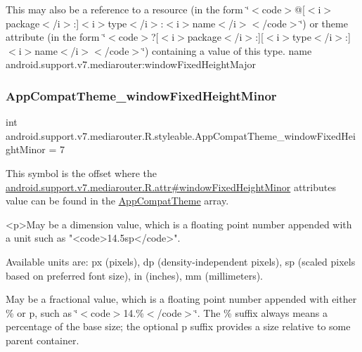 This may also be a reference to a resource (in the form \char`\"{}$<$code$>$@\mbox{[}$<$i$>$package$<$/i$>$\+:\mbox{]}$<$i$>$type$<$/i$>$\+:$<$i$>$name$<$/i$>$$<$/code$>$\char`\"{}) or theme attribute (in the form \char`\"{}$<$code$>$?\mbox{[}$<$i$>$package$<$/i$>$\+:\mbox{]}\mbox{[}$<$i$>$type$<$/i$>$\+:\mbox{]}$<$i$>$name$<$/i$>$$<$/code$>$\char`\"{}) containing a value of this type.  name android.\+support.\+v7.\+mediarouter\+:window\+Fixed\+Height\+Major \mbox{\label{classandroid_1_1support_1_1v7_1_1mediarouter_1_1R_1_1styleable_a9d793fbf38eeb7d1b8c2707b951dcf24}} 
\subsubsection{\texorpdfstring{App\+Compat\+Theme\+\_\+window\+Fixed\+Height\+Minor}{AppCompatTheme\_windowFixedHeightMinor}}
{\footnotesize\ttfamily int android.\+support.\+v7.\+mediarouter.\+R.\+styleable.\+App\+Compat\+Theme\+\_\+window\+Fixed\+Height\+Minor = 7\hspace{0.3cm}{\ttfamily [static]}}

This symbol is the offset where the \hyperlink{classandroid_1_1support_1_1v7_1_1mediarouter_1_1R_1_1attr_a6225254ac3740a7bf55305b4825f479b}{android.\+support.\+v7.\+mediarouter.\+R.\+attr\#window\+Fixed\+Height\+Minor} attribute\textquotesingle{}s value can be found in the \hyperlink{classandroid_1_1support_1_1v7_1_1mediarouter_1_1R_1_1styleable_a4e3d3900c75d49aeb2f283cac00214d6}{App\+Compat\+Theme} array.

\begin{DoxyVerb}      <p>May be a dimension value, which is a floating point number appended with a unit such as "<code>14.5sp</code>".
\end{DoxyVerb}
 Available units are\+: px (pixels), dp (density-\/independent pixels), sp (scaled pixels based on preferred font size), in (inches), mm (millimeters). 

May be a fractional value, which is a floating point number appended with either \% or p, such as \char`\"{}$<$code$>$14.\%$<$/code$>$\char`\"{}. The \% suffix always means a percentage of the base size; the optional p suffix provides a size relative to some parent container. 

